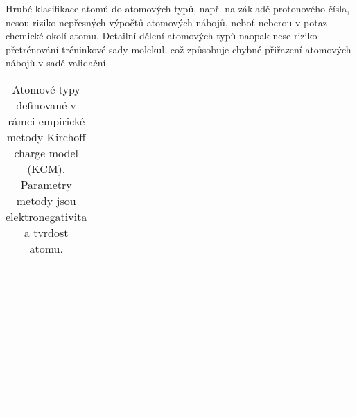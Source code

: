 Hrubé klasifikace atomů do atomových typů, např. na základě protonového čísla, nesou riziko nepřesných výpočtů atomových nábojů, neboť neberou v potaz chemické okolí atomu. Detailní dělení atomových typů naopak nese riziko přetrénování tréninkové sady molekul, což způsobuje chybné přiřazení atomových nábojů v sadě validační. 

\begin{table}[]
    \centering
    \begin{tabular}{c|c}
         &  \\
         &  \\
         &  \\
         &  \\
         &  \\
         &  \\
         &  \\
         &  \\
         &  \\
         &  \\
         &  \\
         &  \\
         &  \\
         &  \\
         &  \\
         &  \\
         &  \\
         &  \\
         &  \\
         &  \\
         &  \\
         &  \\
         &  \\
         &  \\
         &  \\
         &  \\
         &  \\
         &  \\
         &  \\
         &  \\
         &  \\
         &  \\
         &  \\
         &  \\
         & 
    \end{tabular}
    \caption{Atomové typy definované v rámci empirické metody Kirchoff charge model (KCM). Parametry metody jsou elektronegativita a tvrdost atomu.}
    \label{atom_types_examples}
\end{table}


